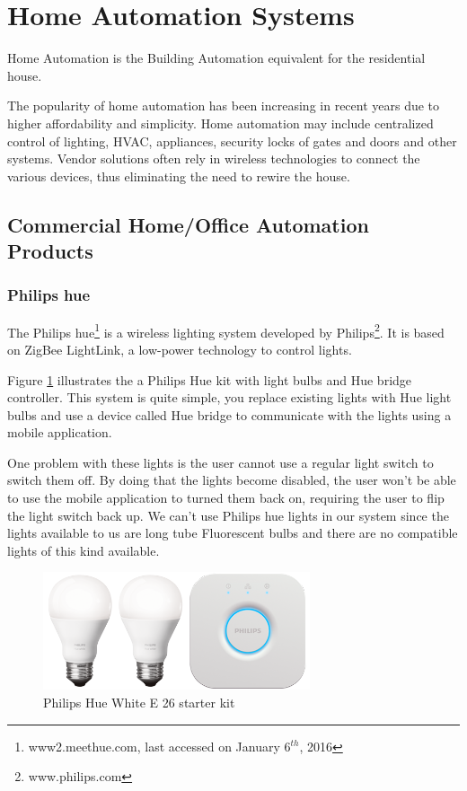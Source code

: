 \section{Home Automation Systems} \label{ssec:num1}

Home Automation is the Building Automation equivalent for the residential house.

The popularity of home automation has been increasing in recent years due to higher affordability and simplicity. Home automation  may include centralized control of lighting, \ac{HVAC}, appliances, security locks of gates and doors and other systems.
Vendor solutions often rely in wireless technologies to connect the various devices, thus eliminating the need to rewire the house.

\subsection{Commercial Home/Office Automation Products}



\subsubsection{Philips hue}



The Philips hue\footnote{www2.meethue.com, last accessed on January 6$^{th}$, 2016} is a wireless lighting system developed by Philips\footnote{www.philips.com}. It is based on ZigBee LightLink\cite{zigbee:ZLL}, a low-power technology to control lights.

Figure \ref{fig:zll} illustrates the a Philips Hue kit with light bulbs and Hue bridge controller. This system is quite simple, you replace existing lights with Hue light bulbs and use a device called Hue bridge to communicate with the lights using a mobile application. 

One problem with these lights is the user cannot use a regular light switch to switch them off. By doing that the lights become disabled, the user won't be able to use the mobile application to turned them back on, requiring the user to flip the light switch back up. We can't use Philips hue lights in our system since the lights available to us are long tube  Fluorescent bulbs and there are no compatible lights of this kind available.


\begin{figure}[h]
\centering
\includegraphics[width=0.7\textwidth]{Figures/hue-white-starter-kit-image}
\caption{Philips Hue White E 26 starter kit}
\label{fig:zll}
\end{figure}

